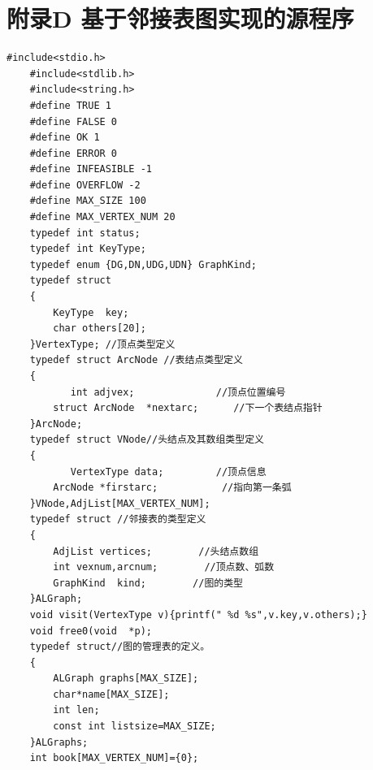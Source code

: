\documentclass[supercite]{Experimental_Report}
\theoremstyle{definition}
\begin{document}
\section{附录D 基于邻接表图实现的源程序}
\begin{lstlisting}[title =def,frame=none]
	#include<stdio.h>
	#include<stdlib.h>
	#include<string.h>
	#define TRUE 1
	#define FALSE 0
	#define OK 1
	#define ERROR 0
	#define INFEASIBLE -1
	#define OVERFLOW -2
	#define MAX_SIZE 100
	#define MAX_VERTEX_NUM 20
	typedef int status;
	typedef int KeyType; 
	typedef enum {DG,DN,UDG,UDN} GraphKind;
	typedef struct 
	{
		KeyType  key;
		char others[20];
	}VertexType; //顶点类型定义
	typedef struct ArcNode //表结点类型定义
	{         
		   int adjvex;              //顶点位置编号 
		struct ArcNode  *nextarc;	   //下一个表结点指针
	}ArcNode;
	typedef struct VNode//头结点及其数组类型定义
	{
		   VertexType data;       	//顶点信息
		ArcNode *firstarc;      	 //指向第一条弧
	}VNode,AdjList[MAX_VERTEX_NUM];
	typedef struct //邻接表的类型定义
	{
		AdjList vertices;     	 //头结点数组
		int vexnum,arcnum;   	  //顶点数、弧数
		GraphKind  kind;        //图的类型
	}ALGraph;
	void visit(VertexType v){printf(" %d %s",v.key,v.others);}
	void free0(void  *p);
	typedef struct//图的管理表的定义。 
	{
		ALGraph graphs[MAX_SIZE];
		char*name[MAX_SIZE];
		int len;
		const int listsize=MAX_SIZE;
	}ALGraphs;
	int book[MAX_VERTEX_NUM]={0};
\end{lstlisting}
\end{document}
